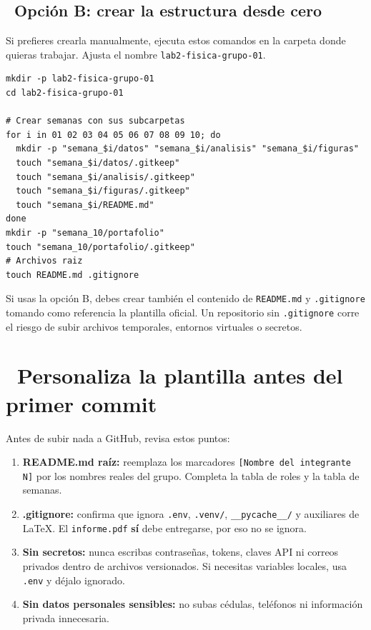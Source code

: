\documentclass[11pt,a4paper]{article}
\newcommand{\iconotexto}[2]{\textcolor{cyanNeon}{\faIcon{#1}}~#2}
\begin{document}
\subsection{\iconotexto{terminal}{Opción B: crear la estructura desde cero}}

Si prefieres crearla manualmente, ejecuta estos comandos en la carpeta donde quieras trabajar. Ajusta el nombre \texttt{lab2-fisica-grupo-01}.

\begin{lstlisting}
mkdir -p lab2-fisica-grupo-01
cd lab2-fisica-grupo-01

# Crear semanas con sus subcarpetas
for i in 01 02 03 04 05 06 07 08 09 10; do
  mkdir -p "semana_$i/datos" "semana_$i/analisis" "semana_$i/figuras"
  touch "semana_$i/datos/.gitkeep"
  touch "semana_$i/analisis/.gitkeep"
  touch "semana_$i/figuras/.gitkeep"
  touch "semana_$i/README.md"
done
mkdir -p "semana_10/portafolio"
touch "semana_10/portafolio/.gitkeep"
# Archivos raiz
touch README.md .gitignore
\end{lstlisting}

\begin{tcolorbox}[cajaMejora,title={\faIcon{exclamation-triangle}~No olvides los archivos base}]
Si usas la opción B, debes crear también el contenido de \texttt{README.md} y \texttt{.gitignore} tomando como referencia la plantilla oficial. Un repositorio sin \texttt{.gitignore} corre el riesgo de subir archivos temporales, entornos virtuales o secretos.
\end{tcolorbox}

\section{\iconotexto{user-edit}{Personaliza la plantilla antes del primer commit}}

Antes de subir nada a GitHub, revisa estos puntos:

\begin{enumerate}[leftmargin=1.6em,itemsep=4pt,topsep=2pt]
  \item \textbf{README.md raíz:} reemplaza los marcadores \texttt{[Nombre del integrante N]} por los nombres reales del grupo. Completa la tabla de roles y la tabla de semanas.
  \item \textbf{.gitignore:} confirma que ignora \texttt{.env}, \texttt{.venv/}, \texttt{\_\_pycache\_\_/} y auxiliares de LaTeX. El \texttt{informe.pdf} \textbf{sí} debe entregarse, por eso no se ignora.
  \item \textbf{Sin secretos:} nunca escribas contraseñas, tokens, claves API ni correos privados dentro de archivos versionados. Si necesitas variables locales, usa \texttt{.env} y déjalo ignorado.
  \item \textbf{Sin datos personales sensibles:} no subas cédulas, teléfonos ni información privada innecesaria.
\end{enumerate}
\end{document}
